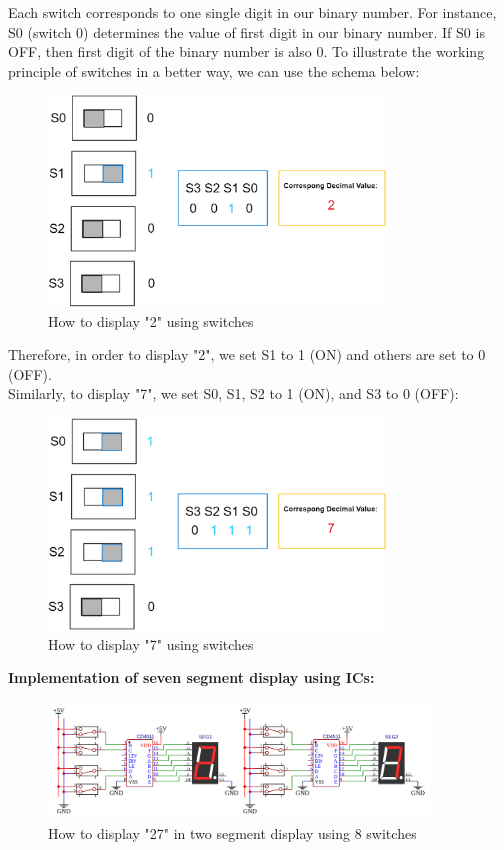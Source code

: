 \documentclass[pdftex,12pt,a4paper]{article}
\begin{document}
\begin{itemize}
\begin{itemize}
   Each switch corresponds to one single digit in our binary number. For instance, S0 (switch 0) determines the value of first digit in our binary number. If S0 is OFF, then first digit of the binary number is also 0. To illustrate the working principle of switches in a better way, we can use the schema below:
   \begin{figure}[H]
    \centering
        \includegraphics[width=0.8\textwidth]{display2.png}	
        \caption{How to display "2" using switches}
        \label{fig1}
   \end{figure}
   Therefore, in order to display "2", we set S1 to 1 (ON) and others are set to 0 (OFF).\\

   Similarly, to display "7", we set S0, S1, S2 to 1 (ON), and S3 to 0 (OFF):
   \begin{figure}[H]
    \centering
        \includegraphics[width=0.8\textwidth]{display7.png}	
        \caption{How to display "7" using switches}
        \label{fig1}
   \end{figure}

   \newpage
   \textbf{Implementation of seven segment display using ICs:}
   \begin{figure}[H]
    \centering
        \includegraphics[width=0.9\textwidth]{part5.png}	
        \caption{How to display "27" in two segment display using 8 switches}
        \label{fig1}
   \end{figure}
    \end{itemize}
    

\end{itemize}
\end{document}
